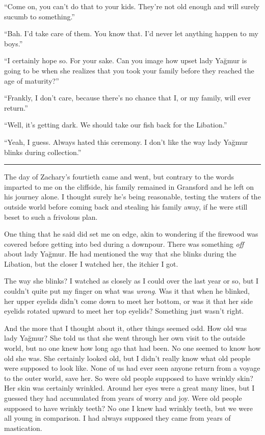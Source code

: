 \documentclass[11pt]{memoir}
\begin{document}
``Come on, you can't do that to your kids. They're not old enough and will surely sucumb to something.''

``Bah. I'd take care of them. You know that. I'd never let anything happen to my boys.''

``I certainly hope so. For your sake. Can you image how upset lady Yağmur is going to be when she realizes that you took your family before they reached the age of maturity?''

``Frankly, I don't care, because there's no chance that I, or my family, will ever return.''

``Well, it's getting dark. We should take our fish back for the Libation.''

``Yeah, I guess. Always hated this ceremony. I don't like the way lady Yağmur blinks during collection.''

\noindent\rule{\textwidth}{1pt}

The day of Zachary's fourtieth came and went, but contrary to the words imparted to me on the cliffside, his family remained in Gransford and he left on his journey alone. I thought surely he's being reasonable, testing the waters of the outside world before coming back and stealing his family away, if he were still beset to such a frivolous plan.

One thing that he said did set me on edge, akin to wondering if the firewood was covered before getting into bed during a downpour. There was something \textit{off} about lady Yağmur. He had mentioned the way that she blinks during the Libation, but the closer I watched her, the itchier I got.

The way she blinks? I watched as closely as I could over the last year or so, but I couldn't quite put my finger on what was \textit{wrong}. Was it that when he blinked, her upper eyelids didn't come down to meet her bottom, or was it that her side eyelids rotated upward to meet her top eyelids? Something just wasn't right.

And the more that I thought about it, other things seemed odd. How old was lady Yağmur? She told us that she went through her own visit to the outside world, but no one knew how long ago that had been. No one seemed to know how old she was. She certainly looked old, but I didn't really know what old people were supposed to look like. None of us had ever seen anyone return from a voyage to the outer world, save her. So were old people supposed to have wrinkly skin? Her skin was certainly wrinkled. Around her eyes were a great many lines, but I guessed they had accumulated from years of worry and joy. Were old people supposed to have wrinkly teeth? No one I knew had wrinkly teeth, but we were all young in comparison. I had always supposed they came from years of mastication.
\end{document}
